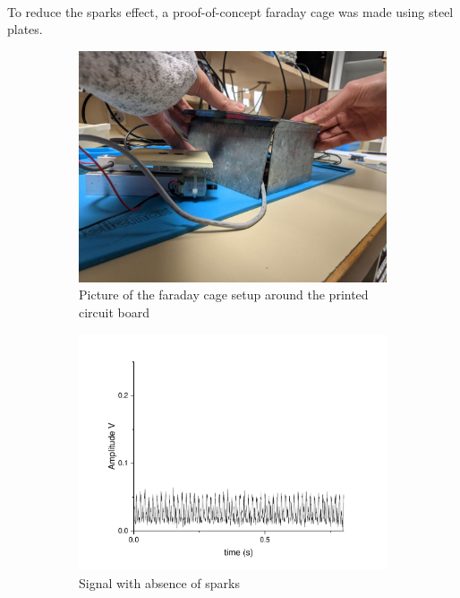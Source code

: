 \documentclass{article}[12pt]
\begin{document}
\paragraph{}
To reduce the sparks effect, a proof-of-concept faraday cage was made using steel plates. 
\begin{figure}[H]
\centering
\begin{subfigure}{.5\textwidth}
  \centering
  \includegraphics[width=\linewidth]{figures/faraday.jpg}
  \caption{Picture of the faraday cage setup around the printed circuit board}
  \label{fig:faradaypic}
\end{subfigure}%
\begin{subfigure}{.5\textwidth}
  \centering
  \includegraphics[width=\linewidth]{figures/faraday.pdf}
  \caption{Signal with absence of sparks}
  \label{fig:faradaysig}
\end{subfigure}
\caption{}
\label{fig:faraday}
\end{figure}
\end{document}
